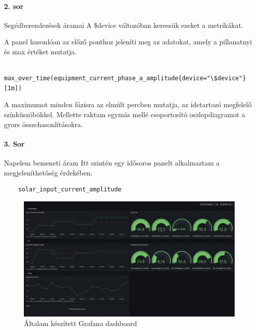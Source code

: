 \paragraph{2. sor}
Segédberendezések áramai
A \$device változóban keressük ezeket a metrikákat.

A panel hasonlóan az előző ponthoz jeleníti meg az adatokat, amely a pillanatnyi 
és max értéket mutatja.
\begin{lstlisting}
    max_over_time(equipment_current_phase_a_amplitude{device="\$device"}[1m])
\end{lstlisting}
A maximumot minden fázisra az elmúlt percben mutatja, az idetartozó 
megfelelő színküszöbökkel.
Mellette raktam egymás mellé csoportosító oszlopdiagramot a gyors 
összehasonlításokra.

\paragraph{3. Sor}
Napelem bemeneti áram
Itt szintén egy idősoros panelt alkalmaztam a megjeleníthetőség érdekében.
\begin{lstlisting}
    solar_input_current_amplitude
\end{lstlisting}

\begin{figure}[!ht]
    \centering
    \includegraphics[width=1\textwidth, keepaspectratio]{figures/Grafana.png}
    \caption{Általam készített Grafana dashboard} 
\end{figure}
